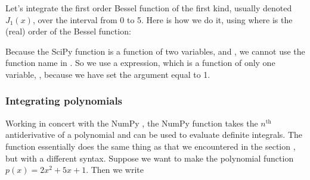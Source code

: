 \documentclass[letterpaper,10pt,english]{sphinxmanual}
\begin{document}
\sphinxAtStartPar
Let’s integrate the first order Bessel function of the first kind, usually denoted \(J_1(x)\), over the interval from 0 to 5.  Here is how we do it, using  where  is the (real) order of the Bessel function:

\begin{sphinxVerbatim}[commandchars=\\\{\}]
 

  
 
\end{sphinxVerbatim}

\sphinxAtStartPar
Because the SciPy function  is a function of two variables,  and , we cannot use the function name  in .  So we use a  expression, which is a function of only one variable, , because we have set the  argument equal to 1.

\ignorespaces 

\subsubsection{Integrating polynomials}
\label{\detokenize{chap9/chap9_scipy:integrating-polynomials}}\label{\detokenize{chap9/chap9_scipy:index-2}}
\sphinxAtStartPar
Working in concert with the NumPy , the NumPy function  takes the \(n^\mathrm{th}\) antiderivative of a polynomial and can be used to evaluate definite integrals.  The function  essentially does the same thing as  that we encountered in the section {\hyperref[\detokenize{chap9/chap9_scipy:specfunc}]{}}, but with a different syntax.  Suppose we want to make the polynomial function \(p(x) = 2x^2 + 5x +1\).  Then we write
\end{document}
